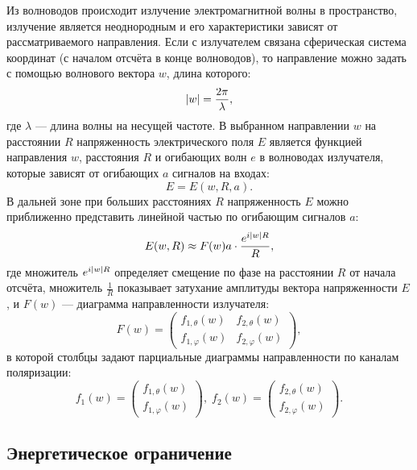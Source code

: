 Из волноводов происходит излучение электромагнитной волны в пространство, излучение является неоднородным и его характеристики зависят от рассматриваемого направления.
Если с излучателем связана сферическая система координат (с началом отсчёта в конце волноводов), то направление можно задать с помощью волнового вектора $w$,
длина которого:
\[
    \left | w \right | = \frac{2 \pi}{\lambda},
\]
где $\lambda$ --- длина волны на несущей частоте. В выбранном направлении $w$ на расстоянии $R$ напряженность электрического поля $E$ является функцией
направления $w$, расстояния $R$ и огибающих волн $e$ в волноводах излучателя, которые зависят от огибающих $a$ сигналов на входах:
\[
    E = E(w, R, a).
\]
В дальней зоне при больших расстояниях $R$ напряженность $E$ можно приближенно представить линейной частью по огибающим сигналов $a$:
\begin{equation}
    \label{emission:emitter:diagram:tension}
    E(w,R)
    \approx F(w) a \cdot \frac{e^{i \left | w \right | R}}{R} ,
\end{equation}
где множитель $e^{i \left | w \right | R}$ определяет смещение по фазе на расстоянии $R$ от начала отсчёта, множитель $\frac{1}{R}$ показывает затухание амплитуды
вектора напряженности $E$, и $F(w)$ --- диаграмма направленности излучателя:
\[
    F(w)
    = \begin{pmatrix}
          f_{1, \theta}(w)  & f_{2, \theta}(w)  \\
          f_{1, \varphi}(w) & f_{2, \varphi}(w)
    \end{pmatrix} ,
\]
в которой столбцы задают парциальные диаграммы направленности по каналам поляризации:
\begin{equation}
    f_1(w)
    = \begin{pmatrix}
          f_{1,\theta}(w) \\
          f_{1,\varphi}(w)
    \end{pmatrix}
    , \;
    f_2(w)
    = \begin{pmatrix}
          f_{2,\theta}(w) \\
          f_{2,\varphi}(w)
    \end{pmatrix}
    \label{emission:emitter:diagram:partial}
    .
\end{equation}


\subsection{Энергетическое ограничение}


